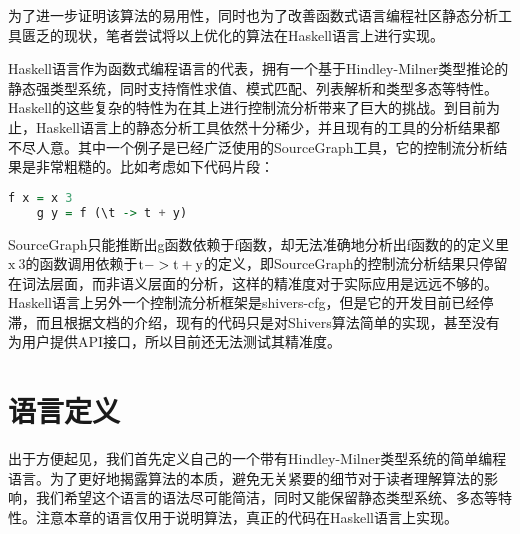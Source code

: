 \documentclass[12pt, titlepage]{article}
\begin{document}
	为了进一步证明该算法的易用性，同时也为了改善函数式语言编程社区静态分析工具匮乏的现状，笔者尝试将以上优化的算法在Haskell语言上进行实现。
	
	Haskell语言作为函数式编程语言的代表，拥有一个基于Hindley-Milner类型推论的静态强类型系统，同时支持惰性求值、模式匹配、列表解析和类型多态等特性。Haskell的这些复杂的特性为在其上进行控制流分析带来了巨大的挑战。到目前为止，Haskell语言上的静态分析工具依然十分稀少，并且现有的工具的分析结果都不尽人意。其中一个例子是已经广泛使用的SourceGraph工具，它的控制流分析结果是非常粗糙的。比如考虑如下代码片段：
	\begin{lstlisting}[language=haskell]
	f x = x 3
	g y = f (\t -> t + y)
	\end{lstlisting}
	SourceGraph只能推断出g函数依赖于f函数，却无法准确地分析出f函数的的定义里$\mathrm{x\ 3}$的函数调用依赖于$\mathrm{\\t -> t + y}$的定义，即SourceGraph的控制流分析结果只停留在词法层面，而非语义层面的分析，这样的精准度对于实际应用是远远不够的。Haskell语言上另外一个控制流分析框架是shivers-cfg，但是它的开发目前已经停滞，而且根据文档的介绍，现有的代码只是对Shivers算法简单的实现，甚至没有为用户提供API接口，所以目前还无法测试其精准度。

	\newpage	
	\section{语言定义}
	出于方便起见，我们首先定义自己的一个带有Hindley-Milner类型系统的简单编程语言。为了更好地揭露算法的本质，避免无关紧要的细节对于读者理解算法的影响，我们希望这个语言的语法尽可能简洁，同时又能保留静态类型系统、多态等特性。注意本章的语言仅用于说明算法，真正的代码在Haskell语言上实现。
	
\end{document}
